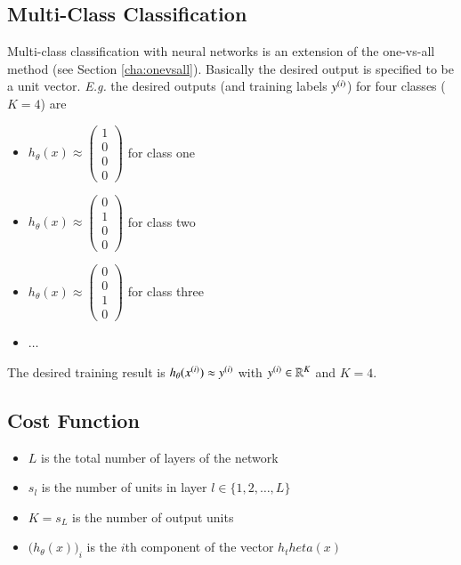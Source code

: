 \documentclass[a4paper,twoside,10pt]{article}
\begin{document}
\subsection{Multi-Class Classification}\label{cha:multiclassif}
Multi-class classification with neural networks is an extension of the one-vs-all method (see Section \ref{cha:onevsall}).
Basically the desired output is specified to be a unit vector.
\emph{E.g.} the desired outputs (and training labels $y^{(i)}$) for four classes ($K=4$) are
\begin{itemize}
  \item $h_\theta(x)\approx\begin{pmatrix}1\\0\\0\\0\end{pmatrix}$ for class one
  \item $h_\theta(x)\approx\begin{pmatrix}0\\1\\0\\0\end{pmatrix}$ for class two
  \item $h_\theta(x)\approx\begin{pmatrix}0\\0\\1\\0\end{pmatrix}$ for class three
  \item $\ldots$
\end{itemize}
The desired training result is $h_\theta(x^{(i)})\approx y^{(i)}$ with $y^{(i)}\in\mathbb{R}^K$ and $K=4$.

\subsection{Cost Function}
\begin{itemize}
  \item $L$ is the total number of layers of the network
  \item $s_l$ is the number of units in layer $l\in\{1,2,\ldots,L\}$
  \item $K=s_L$ is the number of output units
  \item $\big(h_\theta(x)\big)_i$ is the $i$th component of the vector $h_theta(x)$
\end{itemize}
\end{document}
